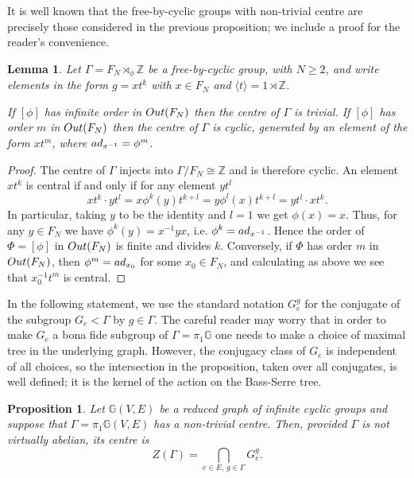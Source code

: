 \documentclass[11pt, a4 paper]{amsart}
\numberwithin{equation}{section}
\newtheorem{proposition}[theorem]{Proposition}
\newtheorem{lemma}[theorem]{Lemma}
\theoremstyle{remark}
\theoremstyle{definition}
\def\Z{\mathbb Z}
\def\G{\Gamma}
\def\out{{\rm{Out}}}
\def\GG{\mathbb{G}}
\def\ad{{\rm{ad}}}
\def\G{\Gamma}
\def\<{\langle}
\def\>{\rangle}
\begin{document}
It is well known that 
the free-by-cyclic groups with non-trivial centre 
are precisely those considered in the previous proposition; 
we include a proof for the reader's convenience. 

\begin{lemma}
\label{free-by-cyclic-with-centre} 
	Let $\G = F_N \rtimes_\phi \Z$ be a free-by-cyclic group, 
	with $N\ge 2$, and write elements in the form $g=xt^k$ 
	with $x\in F_N$ and $\<t\> = 1\rtimes\Z$.
	
	If $[\phi]$ has infinite order in $\out(F_N)$ 
	then the centre of $\G$ is trivial.
	If $[\phi]$ has order $m$ in $\out(F_N)$ 
	then the centre of $\G$ is cyclic, 
	generated by an element of the form $xt^m$, 
	where $\ad_{x^{-1}} = \phi^m$. 
\end{lemma}


\begin{proof}   
	The centre of $\G$ injects into $\G/F_N\cong\Z$ 
	and is therefore cyclic.
	An element $xt^k$ is central if and only if 
	for any element $yt^l$ 
	\begin{equation*}
		xt^k \cdot yt^l = x \phi^k(y)t^{k+l}
		= y\phi^l(x)t^{k+l} = yt^l\cdot xt^k.
	\end{equation*}
	In particular, taking $y$ to be the identity and $l = 1$ 
	we get $\phi(x) = x$. 
	Thus, for any $y \in F_N$ we have 
	$\phi^k(y) = x^{-1}y x$, i.e. $\phi^k = \ad_{x^{-1}}$. 
	Hence the order of $\Phi = [\phi]$ in $\out(F_N)$ 
	is finite and divides $k$. 
	Conversely, if $\Phi$ has order $m$ in $\out(F_N)$, 
	then $\phi^m = \ad_{x_0}$ for some $x_0\in F_N$, 
	and calculating as above we see that $x_0^{-1}t^m$ is central.  
\end{proof}

In the following statement, 
we use the standard notation $G_e^g$ for 
the conjugate of the subgroup $G_e<\G$ by $g\in\G$. 
The careful reader may worry that
in order to make $G_e$ a bona fide subgroup of $\G=\pi_1\GG$
one needs to make a choice of maximal tree in the underlying graph. 
However, the conjugacy class of $G_e$ 
is independent of all choices, 
so the intersection in the proposition, taken over all conjugates, 
is well defined; 
it is the kernel of the action on the Bass-Serre tree. 

\begin{proposition}
\label{center_upstairs} 
	Let $\GG(V,E)$ be a reduced graph of infinite cyclic groups 
	and suppose that $\G=\pi_1\GG(V,E)$ has a non-trivial centre. 
	Then, provided $\G$ is not virtually abelian, its centre is 
	$$Z(\G) =\bigcap_{e \in E,\, g\in \G} G_e^g.$$
\end{proposition}
\end{document}
